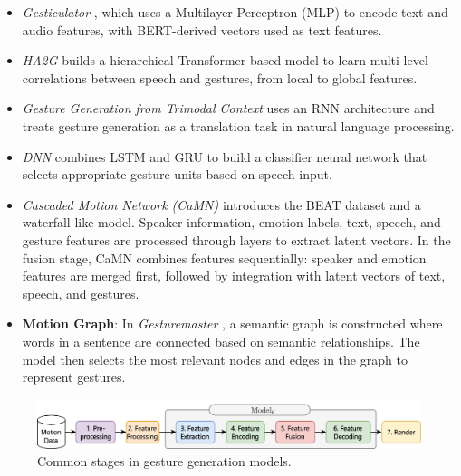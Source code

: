 \begin{itemize}
	\item \textit{Gesticulator} \cite{kucherenko2020gesticulator}, which uses a Multilayer Perceptron (MLP) to encode text and audio features, with BERT-derived vectors used as text features.
	
	\item \textit{HA2G} \cite{liu2022learning} builds a hierarchical Transformer-based model to learn multi-level correlations between speech and gestures, from local to global features.
	
	\item \textit{Gesture Generation from Trimodal Context} \cite{yoon2020speech} uses an RNN architecture and treats gesture generation as a translation task in natural language processing.
	
	\item \textit{DNN} \cite{chiu2015predicting} combines LSTM and GRU to build a classifier neural network that selects appropriate gesture units based on speech input.
	
	\item \textit{Cascaded Motion Network (CaMN)} \cite{liu2022beat} introduces the BEAT dataset and a waterfall-like model. Speaker information, emotion labels, text, speech, and gesture features are processed through layers to extract latent vectors. In the fusion stage, CaMN combines features sequentially: speaker and emotion features are merged first, followed by integration with latent vectors of text, speech, and gestures.
	
	\item \textbf{Motion Graph}: In \textit{Gesturemaster} \cite{zhou2022gesturemaster}, a semantic graph is constructed where words in a sentence are connected based on semantic relationships. The model then selects the most relevant nodes and edges in the graph to represent gestures.
\end{itemize}


\vfill
\begin{figure}[htbp]
	\centering
	\includegraphics[width=0.9\linewidth]{figures/CommonStage.png}
	\caption{Common stages in gesture generation models.}
	\label{fig:CommonStage}
\end{figure}


